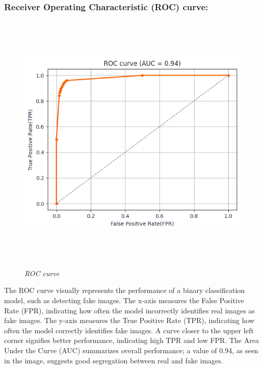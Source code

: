 \subsubsection{Receiver Operating Characteristic (ROC) curve:}
\begin{figure}[ht]
    \centering
    \includegraphics[width=5in, height =5in ]{img/ROC_AUC.png}
    \caption{\textit{ROC curve }}
\end{figure}

The ROC curve visually represents the performance of a binary classification model, such as detecting fake images. The x-axis measures the False Positive Rate (FPR), indicating how often the model incorrectly identifies real images as fake images. The y-axis measures the True Positive Rate (TPR), indicating how often the model correctly identifies fake images. A curve closer to the upper left corner signifies better performance, indicating high TPR and low FPR. The Area Under the Curve (AUC) summarizes overall performance; a value of 0.94, as seen in the image, suggests good segregation  between real and fake images.



\newpage
